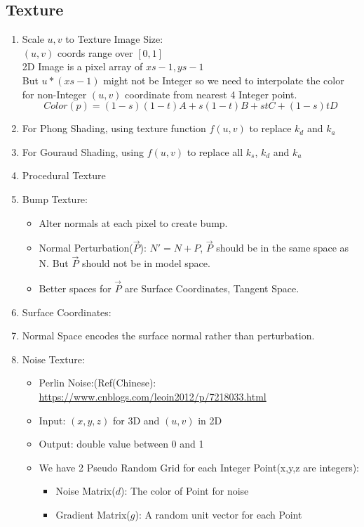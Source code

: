 \documentclass[cyan,normal,en]{elegantnote}
\begin{document}
\subsection{Texture}
\begin{enumerate}
	\item Scale $u,v$ to Texture Image Size:\\
	$(u,v)$ coords range over $[0,1]$\\
	2D Image is a pixel array of $xs-1,ys-1$\\
	But $u*(xs-1)$ might not be Integer so we need to interpolate the color for non-Integer $(u,v)$ coordinate from nearest 4 Integer point.
	$$Color(p)=(1-s)(1-t)A+s(1-t)B+stC+(1-s)tD$$
	\item For Phong Shading, using texture function $f(u,v)$ to replace $k_d$ and $k_a$
	\item For Gouraud Shading, using $f(u,v)$ to replace all $k_s$, $k_d$ and $k_a$
	\item Procedural Texture
	\item Bump Texture:
	\begin{itemize}
		\item Alter normals at each pixel to create bump.
		\item Normal Perturbation($\vec{P}$): $N'=N+P$, $\vec{P}$ should be in the same space as N. But $\vec{P}$ should not be in model space.
		\item Better spaces for $\vec{P}$ are Surface Coordinates, Tangent Space.
	\end{itemize}
	\item Surface Coordinates:
	\item Normal Space encodes the surface normal rather than perturbation.
	\item Noise Texture:
	\begin{itemize}
		\item Perlin Noise:(Ref(Chinese): \href{https://www.cnblogs.com/leoin2012/p/7218033.html}{https://www.cnblogs.com/leoin2012/p/7218033.html}
		\item Input: $(x,y,z)$ for 3D and $(u,v)$ in 2D
		\item Output: double value between 0 and 1
		\item We have 2 Pseudo Random Grid for each Integer Point(x,y,z are integers):
		\begin{itemize}
			\item Noise Matrix($d$): The color of Point for noise
			\item Gradient Matrix($g$): A random unit vector for each Point

\end{itemize}
\end{itemize}
\end{enumerate}
\end{document}
